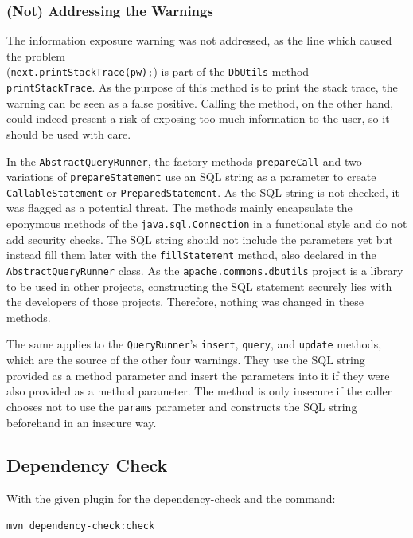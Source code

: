 \documentclass[sigconf]{acmart}
\begin{document}
\subsubsection*{\textbf{(Not) Addressing the Warnings}}

The information exposure warning was not addressed, as the line which caused the problem \\
(\texttt{next.printStackTrace(pw);}) is part of the \texttt{DbUtils} method \\
\texttt{printStackTrace}. As the purpose of this method is to print the stack trace, the warning can be seen as a false positive. Calling the method, on the other hand, could indeed present a risk of exposing too much information to the user, so it should be used with care.

In the \texttt{AbstractQueryRunner}, the factory methods \texttt{prepareCall} and two variations of \texttt{prepareStatement} use an SQL string as a parameter to create \texttt{CallableStatement} or \texttt{PreparedStatement}. As the SQL string is not checked, it was flagged as a potential threat. The methods mainly encapsulate the eponymous methods of the \texttt{java.sql.Connection} in a functional style and do not add security checks. The SQL string should not include the parameters yet but instead fill them later with the \texttt{fillStatement} method, also declared in the \texttt{AbstractQueryRunner} class. As the \texttt{apache.commons.dbutils} project is a library to be used in other projects, constructing the SQL statement securely lies with the developers of those projects. Therefore, nothing was changed in these methods.

The same applies to the \texttt{QueryRunner}'s \texttt{insert}, \texttt{query}, and \texttt{update} methods, which are the source of the other four warnings. They use the SQL string provided as a method parameter and insert the parameters into it if they were also provided as a method parameter. The method is only insecure if the caller chooses not to use the \texttt{params} parameter and constructs the SQL string beforehand in an insecure way.

\subsection*{Dependency Check}

With the given plugin for the dependency-check and the command:

\begin{verbatim}
mvn dependency-check:check
\end{verbatim}
\end{document}
